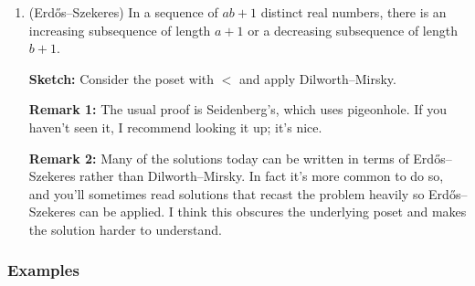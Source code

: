 \documentclass[11pt,paper=letter]{scrartcl}
\begin{document}
\begin{enumerate}
\item (Erd\H{o}s--Szekeres) In a sequence of $ab + 1$ distinct real numbers, there is an increasing subsequence of length $a + 1$ or a decreasing subsequence of length $b + 1$.

\textbf{Sketch:} Consider the poset with $<$ and apply Dilworth--Mirsky.

\textbf{Remark 1:} The usual proof is Seidenberg's, which uses pigeonhole. If you haven't seen it, I recommend looking it up; it's nice.

\textbf{Remark 2:} Many of the solutions today can be written in terms of Erd\H{o}s--Szekeres rather than Dilworth--Mirsky. In fact it's more common to do so, and you'll sometimes read solutions that recast the problem heavily so Erd\H{o}s--Szekeres can be applied. I think this obscures the underlying poset and makes the solution harder to understand.

\end{enumerate}

\subsubsection*{Examples}
\end{document}
